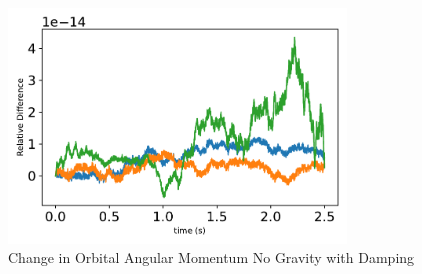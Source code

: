 \begin{figure}[htbp]\centerline{\includegraphics[width=0.8\textwidth]{AutoTeX/ChangeInOrbitalAngularMomentumNoGravityDamping}}\caption{Change in Orbital Angular Momentum No Gravity with Damping}\label{fig:ChangeInOrbitalAngularMomentumNoGravityDamping}\end{figure}